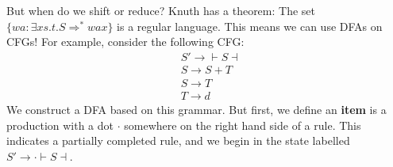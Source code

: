 \documentclass[12pt]{article}
\begin{document}
But when do we shift or reduce?  Knuth has a theorem: The set $\{wa : \exists x s.t. S \Rightarrow^* wax\}$ is a regular language.  This means we can use DFAs on CFGs!  For example, consider the following CFG:
\begin{align}
    &S' \rightarrow \vdash S \dashv \\
    &S \rightarrow S + T \\
    &S \rightarrow T \\
    &T \rightarrow d
\end{align}
We construct a DFA based on this grammar.  But first, we define an \textbf{item} is a production with a dot $\cdot$ somewhere on the right hand side of a rule.  This indicates a partially completed rule, and we begin in the state labelled $S' \rightarrow \cdot \vdash S \dashv$.  
\end{document}
